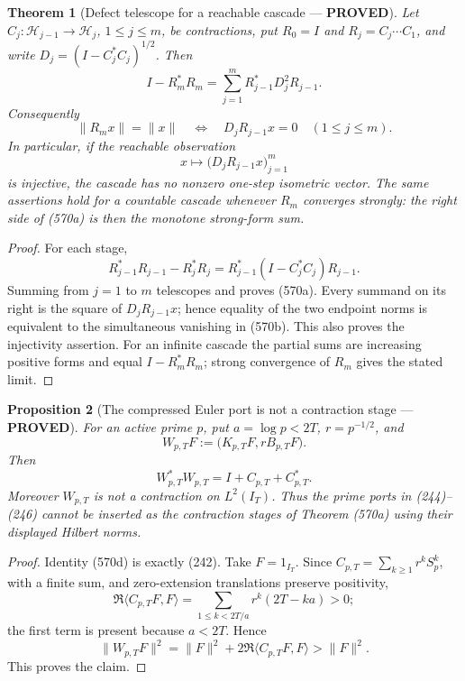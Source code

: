 \documentclass[11pt]{article}
\newtheorem{theorem}{Theorem}
\newtheorem{proposition}[theorem]{Proposition}
\newcommand{\PROVED}{\textcolor{green!45!black}{\textbf{PROVED}}}
\begin{document}
\begin{theorem}[Defect telescope for a reachable cascade --- \PROVED]
Let
\(C_j:\mathscr H_{j-1}\to\mathscr H_j\), \(1\le j\le m\), be
contractions, put \(R_0=I\) and
\(R_j=C_j\cdots C_1\), and write
\(D_j=(I-C_j^*C_j)^{1/2}\).  Then
\begin{equation}
 \boxed{I-R_m^*R_m
 =\sum_{j=1}^mR_{j-1}^*D_j^2R_{j-1}.}                \tag{570a}
\end{equation}
Consequently
\begin{equation}
 \|R_mx\|=\|x\|
 \quad\Longleftrightarrow\quad
 D_jR_{j-1}x=0\quad(1\le j\le m).                   \tag{570b}
\end{equation}
In particular, if the reachable observation
\begin{equation}
 x\longmapsto\bigl(D_jR_{j-1}x\bigr)_{j=1}^m        \tag{570c}
\end{equation}
is injective, the cascade has no nonzero one-step isometric vector.  The
same assertions hold for a countable cascade whenever \(R_m\) converges
strongly: the right side of (570a) is then the monotone strong-form sum.
\end{theorem}

\begin{proof}
For each stage,
\[
 R_{j-1}^*R_{j-1}-R_j^*R_j
 =R_{j-1}^*(I-C_j^*C_j)R_{j-1}.
\]
Summing from \(j=1\) to \(m\) telescopes and proves (570a).  Every summand
on its right is the square of \(D_jR_{j-1}x\); hence equality of the two
endpoint norms is equivalent to the simultaneous vanishing in (570b).
This also proves the injectivity assertion.  For an infinite cascade the
partial sums are increasing positive forms and equal
\(I-R_m^*R_m\); strong convergence of \(R_m\) gives the stated limit.
\end{proof}

\begin{proposition}[The compressed Euler port is not a contraction stage
--- \PROVED]
For an active prime \(p\), put \(a=\log p<2T\), \(r=p^{-1/2}\), and
\[
 W_{p,T}F:=\bigl(K_{p,T}F,rB_{p,T}F\bigr).
\]
Then
\begin{equation}
 W_{p,T}^*W_{p,T}=I+C_{p,T}+C_{p,T}^*.               \tag{570d}
\end{equation}
Moreover \(W_{p,T}\) is not a contraction on \(L^2(I_T)\).  Thus the
prime ports in (244)--(246) cannot be inserted as the contraction stages
of Theorem (570a) using their displayed Hilbert norms.
\end{proposition}

\begin{proof}
Identity (570d) is exactly (242).  Take
\(F=1_{I_T}\).  Since
\(C_{p,T}=\sum_{k\ge1}r^kS_p^k\), with a finite sum, and zero-extension
translations preserve positivity,
\[
 \Re\langle C_{p,T}F,F\rangle
 =\sum_{1\le k<2T/a}r^k(2T-ka)>0;
\]
the first term is present because \(a<2T\).  Hence
\[
 \|W_{p,T}F\|^2
 =\|F\|^2+2\Re\langle C_{p,T}F,F\rangle>\|F\|^2.
\]
This proves the claim.
\end{proof}
\end{document}
